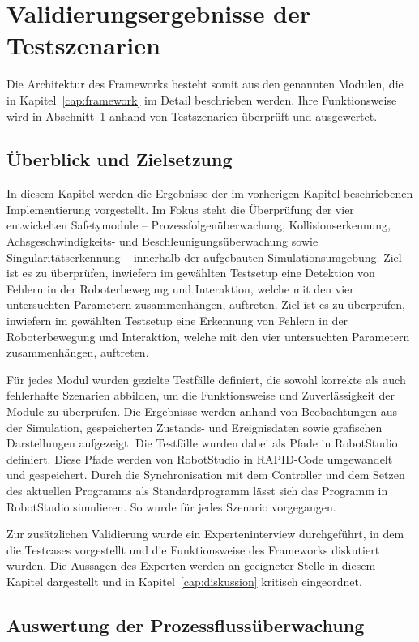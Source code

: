 \chapter{Validierungsergebnisse der Testszenarien}
\label{cap:Ergebnisse}
Die Architektur des Frameworks besteht somit aus den genannten Modulen, die in
Kapitel~\ref{cap:framework} im Detail beschrieben werden. Ihre
Funktionsweise wird in
Abschnitt~\ref{cap:Ergebnisse} anhand von Testszenarien überprüft und
ausgewertet.
\section{Überblick und Zielsetzung}

In diesem Kapitel werden die Ergebnisse der im vorherigen Kapitel beschriebenen
Implementierung vorgestellt. Im Fokus steht die Überprüfung der vier
entwickelten Safetymodule – Prozessfolgenüberwachung, Kollisionserkennung,
Achsgeschwindigkeits- und Beschleunigungsüberwachung sowie
Singularitätserkennung – innerhalb der aufgebauten Simulationsumgebung. Ziel ist
es zu überprüfen, inwiefern im gewählten Testsetup eine Detektion von Fehlern in
der Roboterbewegung und Interaktion, welche mit den vier untersuchten Parametern
zusammenhängen, auftreten. Ziel ist es zu überprüfen, inwiefern im gewählten
Testsetup eine Erkennung von Fehlern in der Roboterbewegung und Interaktion,
welche mit den vier untersuchten Parametern zusammenhängen, auftreten.

Für jedes Modul wurden gezielte Testfälle definiert, die sowohl korrekte als
auch fehlerhafte Szenarien abbilden, um die Funktionsweise und Zuverlässigkeit
der Module zu überprüfen. Die Ergebnisse werden anhand von Beobachtungen aus der
Simulation, gespeicherten Zustands- und Ereignisdaten sowie grafischen
Darstellungen aufgezeigt. Die Testfälle wurden dabei als Pfade in RobotStudio
definiert. Diese Pfade werden von RobotStudio in RAPID-Code umgewandelt und
gespeichert. Durch die Synchronisation mit dem Controller und dem Setzen des
aktuellen Programms als Standardprogramm lässt sich das Programm in RobotStudio
simulieren. So wurde für jedes Szenario vorgegangen.

Zur zusätzlichen Validierung wurde ein Experteninterview durchgeführt, in dem
die Testcases vorgestellt und die Funktionsweise des Frameworks diskutiert
wurden. Die Aussagen des Experten werden an geeigneter Stelle in diesem Kapitel
dargestellt und in Kapitel~\ref{cap:diskussion} kritisch eingeordnet.

\section{Auswertung der Prozessflussüberwachung}
\label{sec:processauswertung}

